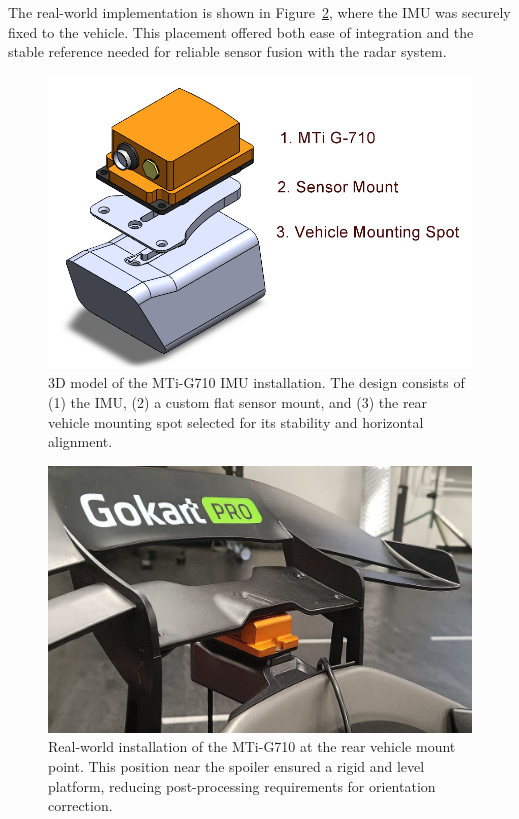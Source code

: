 The real-world implementation is shown in Figure~\ref{fig:MTiRealMount}, where the IMU was securely fixed to the vehicle.  
This placement offered both ease of integration and the stable reference needed for reliable sensor fusion with the radar system.  

\begin{figure}[!htbp]
    \centering
    \includegraphics[width=0.65\linewidth]{images/MTi3DModel.png}
    \caption{3D model of the MTi-G710 IMU installation. 
    The design consists of (1) the IMU, (2) a custom flat sensor mount, and (3) the rear vehicle mounting spot selected for its stability and horizontal alignment.}
    \label{fig:MTi3DModel}
\end{figure}

\begin{figure}[!htbp]
    \centering
    \includegraphics[width=0.65\linewidth]{images/MTiVehicleMount.png}
    \caption{Real-world installation of the MTi-G710 at the rear vehicle mount point. 
    This position near the spoiler ensured a rigid and level platform, reducing post-processing requirements for orientation correction.}
    \label{fig:MTiRealMount}
\end{figure}
